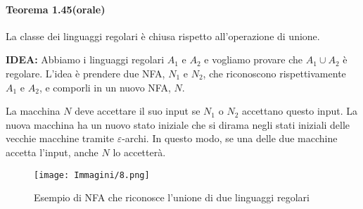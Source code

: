 \documentclass{article}
\begin{document}
\paragraph{Teorema 1.45(orale)}
\label{teorema-1.45}
\vspace{1em}
\text{}
\newline
\begin{tcolorbox}[colback=orange!10!white, colframe=orange!50!black, title=Teorema 1.45 (orale)]
La classe dei linguaggi regolari è chiusa rispetto all'operazione di unione.
\end{tcolorbox}


\textbf{IDEA:}
Abbiamo i linguaggi regolari $A_1$ e $A_2$ e vogliamo provare che $A_1 \cup A_2$ è regolare. L'idea è prendere due NFA, $N_1$ e $N_2$, che riconoscono rispettivamente $A_1$ e $A_2$, e comporli in un nuovo NFA, $N$.

La macchina $N$ deve accettare il suo input se $N_1$ o $N_2$ accettano questo input. La nuova macchina ha un nuovo stato iniziale che si dirama negli stati iniziali delle vecchie macchine tramite $\varepsilon$-archi. In questo modo, se una delle due macchine accetta l'input, anche $N$ lo accetterà.

\begin{figure}[H]
    \centering
    \texttt{[image: Immagini/8.png]}
    \caption{Esempio di NFA che riconosce l'unione di due linguaggi regolari}
    \label{fig:nfa_union1}
\end{figure}
\end{document}
